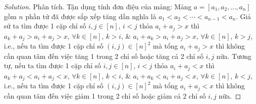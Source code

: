 \documentclass{article}
\begin{document}
\begin{proof}[Solution]
    \item {\sf Phân tích.} Tận dụng tính đơn điệu của mảng: Mảng $a = [a_1,a_2,\ldots,a_n]$ gồm $n$ phần tử đã được sắp xếp tăng dần nghĩa là $a_1 < a_2 < \cdots < a_{n-1} < a_n$. Giả sử ta tìm được 1 cặp chỉ số $i,j\in[n]$, $i < j$ thỏa $a_i + a_j > x$ thì $a_k + a_j > a_i + a_j > x$, $\forall k\in[n]$, $k > i$, \& $a_i + a_k > a_i + a_j > x$, $\forall k\in[n]$, $k > j$, i.e., nếu ta tìm được 1 cặp chỉ số $(i,j)\in[n]^2$ mà tổng $a_i + a_j > x$ thì không cần quan tâm đến việc tăng 1 trong 2 chỉ số hoặc tăng cả 2 chỉ số $i,j$ nữa. Tương tự, nếu ta tìm được 1 cặp chỉ số $i,j\in[n]$, $i < j$ thỏa $a_i + a_j < x$ thì $a_k + a_j < a_i + a_j < x$, $\forall k\in[n]$, $k < i$, \& $a_i + a_k < a_i + a_j < x$, $\forall k\in[n]$, $k < j$, i.e., nếu ta tìm được 1 cặp chỉ số $(i,j)\in[n]^2$ mà tổng $a_i + a_j < x$ thì không cần quan tâm đến việc giảm 1 trong 2 chỉ số hoặc giảm cả 2 chỉ số $i,j$ nữa.


\end{proof}
\end{document}
